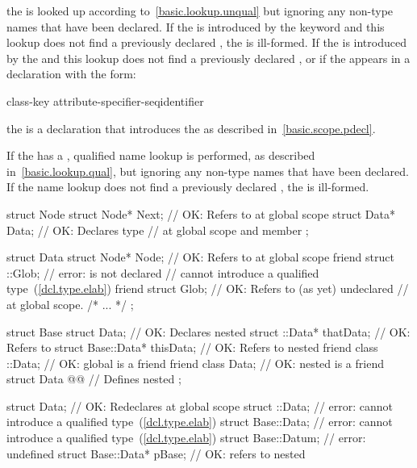 the  is looked up according
to~\ref{basic.lookup.unqual} but ignoring any non-type names that have
been declared. If the  is introduced
by the  keyword and this lookup does not find a previously
declared , the 
is ill-formed. If the  is introduced
by the  and this lookup does not find a previously
declared , or if the
 appears in a declaration with the
form:

\begin{ncbnf}
class-key attribute-specifier-seq\opt identifier \terminal{;}
\end{ncbnf}

the  is a declaration that
introduces the  as described
in~\ref{basic.scope.pdecl}.

\pnum
If the  has a
, qualified name lookup is performed, as
described in~\ref{basic.lookup.qual}, but ignoring any non-type names
that have been declared. If the name lookup does not find a previously
declared , the 
is ill-formed. \enterexample

\begin{codeblock}
struct Node {
  struct Node* Next;            // OK: Refers to  at global scope
  struct Data* Data;            // OK: Declares type 
                                // at global scope and member 
};

struct Data {
  struct Node* Node;            // OK: Refers to  at global scope
  friend struct ::Glob;         // error:  is not declared
                                // cannot introduce a qualified type~(\ref{dcl.type.elab})
  friend struct Glob;           // OK: Refers to (as yet) undeclared 
                                // at global scope.
  /* ... */
};

struct Base {
  struct Data;                  // OK: Declares nested 
  struct ::Data*     thatData;  // OK: Refers to 
  struct Base::Data* thisData;  // OK: Refers to nested 
  friend class ::Data;          // OK: global  is a friend
  friend class Data;            // OK: nested  is a friend
  struct Data @@   // Defines nested 
};

struct Data;                    // OK: Redeclares  at global scope
struct ::Data;                  // error: cannot introduce a qualified type~(\ref{dcl.type.elab})
struct Base::Data;              // error: cannot introduce a qualified type~(\ref{dcl.type.elab})
struct Base::Datum;             // error:  undefined
struct Base::Data* pBase;       // OK: refers to nested 
\end{codeblock}
\exitexample %
%

